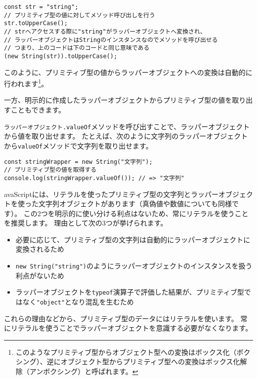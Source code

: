 \begin{lstlisting}
const str = "string";
// プリミティブ型の値に対してメソッド呼び出しを行う
str.toUpperCase();
// strへアクセスする際に"string"がラッパーオブジェクトへ変換され、
// ラッパーオブジェクトはStringのインスタンスなのでメソッドを呼び出せる
// つまり、上のコードは下のコードと同じ意味である
(new String(str)).toUpperCase();
\end{lstlisting}

このように、プリミティブ型の値からラッパーオブジェクトへの変換は自動的に行われます\footnote{このようなプリミティブ型からオブジェクト型への変換はボックス化（ボクシング）、逆にオブジェクト型からプリミティブ型への変換はボックス化解除（アンボクシング）と呼ばれます。}。

一方、明示的に作成したラッパーオブジェクトからプリミティブ型の値を取り出すこともできます。

\texttt{ラッパーオブジェクト.valueOf}メソッドを呼び出すことで、ラッパーオブジェクトから値を取り出せます。
たとえば、次のように文字列のラッパーオブジェクトから\texttt{valueOf}メソッドで文字列を取り出せます。

\begin{lstlisting}
const stringWrapper = new String("文字列");
// プリミティブ型の値を取得する
console.log(stringWrapper.valueOf()); // => "文字列"
\end{lstlisting}

avaScriptには、リテラルを使ったプリミティブ型の文字列とラッパーオブジェクトを使った文字列オブジェクトがあります（真偽値や数値についても同様です）。
この2つを明示的に使い分ける利点はないため、常にリテラルを使うことを推奨します。
理由として次の3つが挙げられます。

\begin{itemize}
\item
  必要に応じて、プリミティブ型の文字列は自動的にラッパーオブジェクトに変換されるため
\item
  \texttt{new String("string")}のようにラッパーオブジェクトのインスタンスを扱う利点がないため
\item
  ラッパーオブジェクトを\texttt{typeof}演算子で評価した結果が、プリミティブ型ではなく\texttt{"object"}となり混乱を生むため
\end{itemize}

これらの理由などから、プリミティブ型のデータにはリテラルを使います。
常にリテラルを使うことでラッパーオブジェクトを意識する必要がなくなります。

